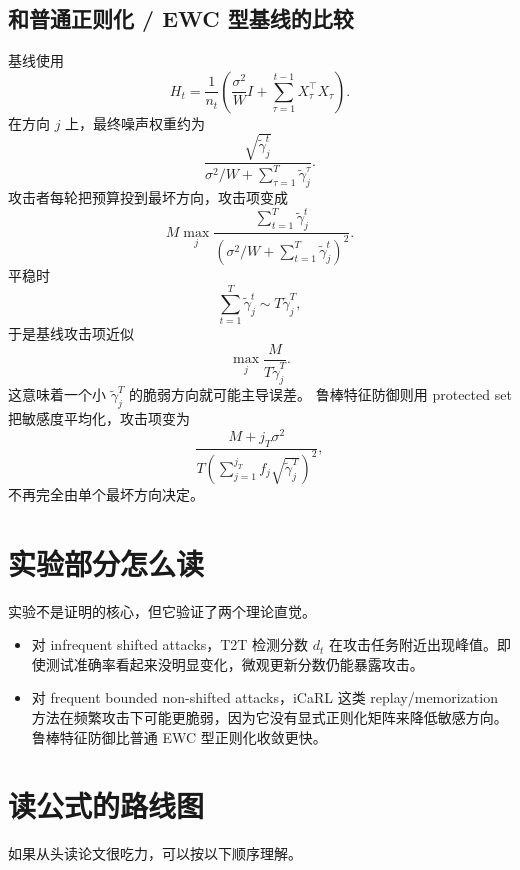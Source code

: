 \documentclass[UTF8,fontset=none,11pt]{ctexart}
\theoremstyle{cnstyle}
\begin{document}
\subsection{和普通正则化 / EWC 型基线的比较}

基线使用
\[
  H_t=\frac{1}{n_t}
  \left(
  \frac{\sigma^2}{W}I+\sum_{\tau=1}^{t-1}X_\tau^\top X_\tau
  \right).
\]
在方向 \(j\) 上，最终噪声权重约为
\[
  \frac{\sqrt{\tilde\gamma_j^t}}
  {\sigma^2/W+\sum_{\tau=1}^T\tilde\gamma_j^\tau}.
\]
攻击者每轮把预算投到最坏方向，攻击项变成
\[
  M\max_j
  \frac{\sum_{t=1}^T\tilde\gamma_j^t}
  {\left(\sigma^2/W+\sum_{t=1}^T\tilde\gamma_j^t\right)^2}.
\]
平稳时
\[
  \sum_{t=1}^T\tilde\gamma_j^t\sim T\tilde\gamma_j^T,
\]
于是基线攻击项近似
\[
  \max_j\frac{M}{T\tilde\gamma_j^T}.
\]
这意味着一个小 \(\tilde\gamma_j^T\) 的脆弱方向就可能主导误差。
鲁棒特征防御则用 protected set 把敏感度平均化，攻击项变为
\[
  \frac{M+j_T\sigma^2}
  {T\left(\sum_{j=1}^{j_T}f_j\sqrt{\tilde\gamma_j^T}\right)^2},
\]
不再完全由单个最坏方向决定。

\section{实验部分怎么读}

实验不是证明的核心，但它验证了两个理论直觉。

\begin{itemize}
  \item 对 infrequent shifted attacks，T2T 检测分数 \(d_t\) 在攻击任务附近出现峰值。即使测试准确率看起来没明显变化，微观更新分数仍能暴露攻击。
  \item 对 frequent bounded non-shifted attacks，iCaRL 这类 replay/memorization 方法在频繁攻击下可能更脆弱，因为它没有显式正则化矩阵来降低敏感方向。鲁棒特征防御比普通 EWC 型正则化收敛更快。
\end{itemize}

\section{读公式的路线图}

如果从头读论文很吃力，可以按以下顺序理解。
\end{document}
